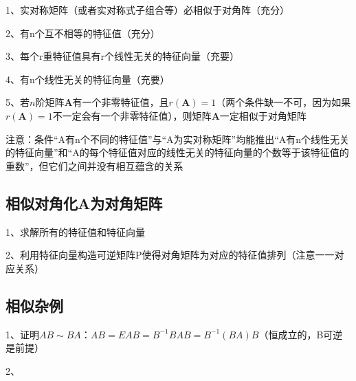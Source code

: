 1、实对称矩阵（或者实对称式子组合等）必相似于对角阵（充分）

2、有n个互不相等的特征值（充分）

3、每个r重特征值具有r个线性无关的特征向量（充要）

4、有n个线性无关的特征向量（充要）

5、若$n$阶矩阵$\boldsymbol{A}$有一个非零特征值，且$r(\boldsymbol{A})=1$（两个条件缺一不可，因为如果$r(\boldsymbol{A})=1$不一定会有一个非零特征值），则矩阵$\boldsymbol{A}$一定相似于对角矩阵

注意：条件“A有n个不同的特征值”与“A为实对称矩阵”均能推出“A有n个线性无关的特征向量”和“A的每个特征值对应的线性无关的特征向量的个数等于该特征值的重数”，但它们之间并没有相互蕴含的关系



\subsection{相似对角化A为对角矩阵}

1、求解所有的特征值和特征向量

2、利用特征向量构造可逆矩阵P使得对角矩阵为对应的特征值排列（注意一一对应关系）



\subsection{相似杂例}

1、证明$AB \sim BA$：$AB = EAB = B^{-1}BAB = B^{-1}(BA)B$（恒成立的，B可逆是前提）

2、

